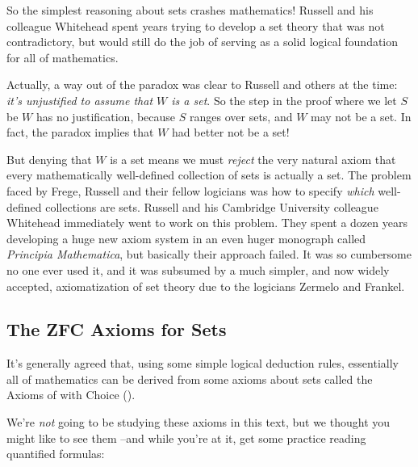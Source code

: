 So the simplest reasoning about sets crashes mathematics!  Russell and his
colleague Whitehead spent years trying to develop a set theory that was
not contradictory, but would still do the job of serving as a solid
logical foundation for all of mathematics.

Actually, a way out of the paradox was clear to Russell and others at
the time: \emph{it's unjustified to assume that $W$ is a set}.  So the
step in the proof where we let $S$ be $W$ has no justification,
because $S$ ranges over sets, and $W$ may not be a set.  In fact, the
paradox implies that $W$ had better not be a set!

But denying that $W$ is a set means we must \emph{reject} the very natural
axiom that every mathematically well-defined collection of sets is
actually a set.  The problem faced by Frege, Russell and their fellow
logicians was how to specify \emph{which} well-defined collections are
sets.  Russell and his Cambridge University colleague Whitehead
immediately went to work on this problem.  They spent a dozen years
developing a huge new axiom system in an even huger monograph called
\emph{Principia Mathematica}, but basically their approach failed.  It was
so cumbersome no one ever used it, and it was subsumed by a much simpler,
and now widely accepted, axiomatization of set theory due to the logicians
Zermelo and Frankel.

\subsection{The ZFC Axioms for Sets}
It's generally agreed that, using some simple logical deduction rules,
essentially all of mathematics can be derived from some axioms about sets
called the Axioms of  with Choice ().

We're \emph{not} going to be studying these axioms in this text, but we
thought you might like to see them --and while you're at it, get some
practice reading quantified formulas:

